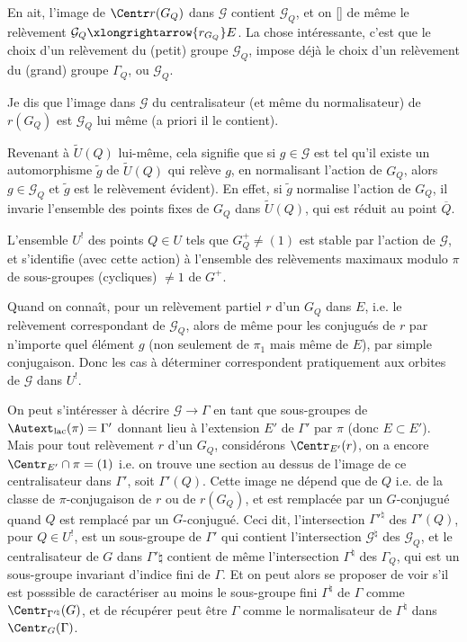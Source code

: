 En ait, l'image de $\Centr r(G_Q)$ dans $\mathcal{G}$ contient $\mathcal{G}_Q$, et on [] de même le relèvement $\mathcal{G}_Q \xlongrightarrow{r_{G_Q}} E$. La chose intéressante, c'est que le choix d'un relèvement du (petit) groupe $\mathcal{G}_Q$, impose déjà le choix d'un relèvement du (grand) groupe $\Gamma_Q$, ou $\mathcal{G}_Q$.

Je dis   que l'image dans $\mathcal{G}$ du centralisateur (et même du normalisateur) de $r(G_Q)$ est $\mathcal{G}_Q$ lui même (a priori il le contient).

Revenant à $\widetilde{U}(Q)$ lui-même, cela signifie que si $g \in \mathcal{G}$ est tel qu'il existe un automorphisme $\widetilde{g}$ de $\widetilde{U}(Q)$ qui relève $g$, en normalisant l'action de $G_Q$, alors $g \in \mathcal{G}_Q$ et $\widetilde{g}$ est le relèvement évident). En effet, si $\widetilde{g}$ normalise l'action de $G_Q$, il invarie l'ensemble des points fixes de $G_Q$ dans $\widetilde{U}(Q)$, qui est réduit au point $\overline{Q}$.

L'ensemble $U^!$ des points $Q \in U$ tels que $G^+_Q \neq (1)$ est stable par l'action de $\mathcal{G}$, et s'identifie (avec cette action) à l'ensemble des relèvements maximaux modulo $\pi$ de sous-groupes (cycliques) $\neq 1$ de $G^+$.

Quand on connaît, pour un relèvement partiel $r$ d'un $G_Q$ dans $E$, i.e. le relèvement correspondant de $\mathcal{G}_Q$, alors de même pour les conjugués de $r$ par n'importe quel élément $g$ (non seulement de $\pi_1$ mais même de $E$), par simple conjugaison. Donc les cas à déterminer correspondent pratiquement aux orbites de $\mathcal{G}$ dans $U^!$. 

On peut s'intéresser à décrire $\mathcal{G} \to \Gamma$ en tant que sous-groupes de $\Autext_{\text{lac}}(\pi) = \Gamma'$ donnant lieu à l'extension $E'$ de $\Gamma'$ par $\pi$ (donc $E \subset  E'$). Mais pour tout relèvement $r$ d'un $G_Q$, considérons $\Centr_{E'}(r)$, on a encore $\Centr_{E'} \cap \pi = (1)$ i.e. on trouve une section au dessus de l'image de ce centralisateur dans $\Gamma'$, soit $\Gamma'(Q)$. Cette image ne dépend que de $Q$ i.e. de la classe de $\pi$-conjugaison de $r$ ou de $r(G_Q)$, et est remplacée par un $G$-conjugué quand $Q$ est remplacé par un $G$-conjugué. Ceci dit, l'intersection $\Gamma'^\natural$ des $\Gamma'(Q)$, pour $Q \in U^!$, est un sous-groupe de $\Gamma'$ qui contient l'intersection $\mathcal{G}^\natural$ des $\mathcal{G}_Q$, et le centralisateur de $G$ dans $\Gamma'\natural$ contient de même l'intersection $\Gamma^\natural$ des $\Gamma_Q$, qui est un sous-groupe invariant d'indice fini de $\Gamma$. Et on peut alors se proposer de voir s'il est posssible de caractériser au moins le sous-groupe fini $\Gamma^\natural$ de $\Gamma$ comme $\Centr_{\Gamma'^\natural}(G)$, et de récupérer peut être $\Gamma$ comme le normalisateur de $\Gamma^\natural$ dans $\Centr_G(\Gamma)$.

